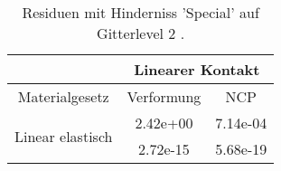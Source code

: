 \begin{table} 
\centering 
\begin{tabular}{c|cc|} 
\cline{2-3} 
 & \multicolumn{2}{|c|}{Linearer Kontakt} \\ 
\hline 
\multicolumn{1}{|c|}{Materialgesetz} & \multicolumn{1}{c|}{Verformung} & \multicolumn{1}{c|}{NCP} \\ 
\hline 
\multicolumn{1}{|c|}{\multirow{2}{*}{Linear elastisch}} &\multicolumn{1}{|c|}{  2.42e+00} & \multicolumn{1}{|c|}{  7.14e-04} \\ 
\multicolumn{1}{|c|}{} & \multicolumn{1}{|c|}{  2.72e-15} & \multicolumn{1}{|c|}{  5.68e-19} \\ 
\hline 
\end{tabular}\caption{Residuen mit Hinderniss 'Special' auf Gitterlevel 2 .}\label{tab:Residuum_Special_level2}
\end{table} 
